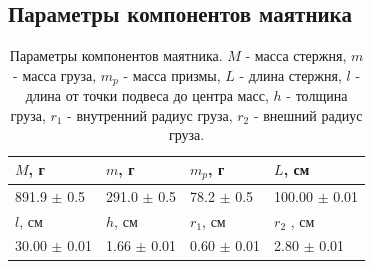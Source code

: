 \documentclass[12pt]{article}
\begin{document}
\subsection{Параметры компонентов маятника} \label{sec:app_3}
\begin{table}[H]
    \begin{center}
        \begin{tabular}{|l|l|l|l|}
            \hline
            $M$, г           & $m$, г          & $m_p$, г       & $L$, см           \\
            \hline
            891.9 $\pm$ 0.5  & 291.0 $\pm$ 0.5 & 78.2 $\pm$ 0.5 & 100.00 $\pm$ 0.01 \\
            \hline
            \hline
            $l$, см          & $h$, см         & $r_1$, см      & $r_2$ , см        \\
            \hline
            30.00 $\pm$ 0.01 & 1.66 $\pm$ 0.01 & 0.60 $\pm$ 0.01 & 2.80 $\pm$ 0.01    \\
            \hline
        \end{tabular}
    \end{center}
    \caption{Параметры компонентов маятника. $M$ - масса стержня, $m$ - масса груза, $m_p$ - масса призмы,
        $L$ - длина стержня, $l$ - длина от точки подвеса до центра масс, $h$ - толщина груза, $r_1$ - внутренний радиус груза,
        $r_2$ - внешний радиус груза.}
    \label{tab:1}
\end{table}
\end{document}
